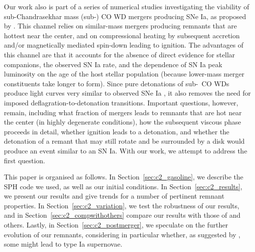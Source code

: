Our work also is part of a series of numerical studies investigating the viability of sub-Chandrasekhar mass (sub-\Mch) CO WD mergers producing SNe Ia, as proposed by \citeal{vkercj10}.  This channel relies on similar-mass mergers producing remnants that are hottest near the center, and on compressional heating by subsequent accretion and/or magnetically mediated spin-down leading to ignition.  The advantages of this channel are that it accounts for the absence of direct evidence for stellar companions, the observed SN Ia rate, and the dependence of SN Ia peak luminosity on the age of the host stellar population (because lower-mass merger constituents take longer to form).  Since pure detonations of sub-\Mch\ CO WDs produce light curves very similar to observed SNe Ia \citep{shig+92,sim+10}, it also removes the need for imposed deflagration-to-detonation transitions.  Important questions, however, remain, including what fraction of mergers leads to remnants that are hot near the center (in highly degenerate conditions), how the subsequent viscous phase proceeds in detail, whether ignition leads to a detonation, and whether the detonation of a remant that may still rotate and be surrounded by a disk would produce an event similar to an SN Ia.  With our work, we attempt to address the first question.

This paper is organised as follows.  In Section~\ref{sec:c2_gasoline}, we describe the SPH code we used, as well as our initial conditions.  In Section~\ref{sec:c2_results}, we present our results and give trends for a number of pertinent remnant properties.  In Section~\ref{sec:c2_variation}, we test the robustness of our results, and in Section~\ref{sec:c2_compwithothers} compare our results with those of \citeal{loreig09} and others.  Lastly, in Section~\ref{sec:c2_postmerger}, we speculate on the further evolution of our remnants, considering in particular whether, as suggested by \citeal{vkercj10}, some might lead to type Ia supernovae.

